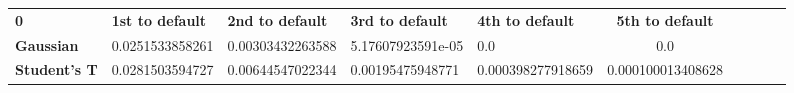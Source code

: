 \begin{center}
 \begin{tabular}{|l|l|l|l|l|c|c|c|c|c|}
\hline
\textbf{0} & \textbf{1st to default} & \textbf{2nd to default} & \textbf{3rd to default} & \textbf{4th to default} & \textbf{5th to default}\\\hhline{|=|=|=|=|=|=|}
\textbf{Gaussian} & 0.0251533858261 & 0.00303432263588 & 5.17607923591e-05 & 0.0 & 0.0\\
\textbf{Student's T} & 0.0281503594727 & 0.00644547022344 & 0.00195475948771 & 0.000398277918659 & 0.000100013408628\\
\hline
\end{tabular}
\end{center}